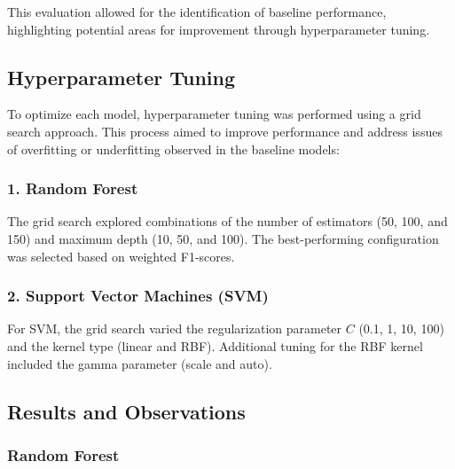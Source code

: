         This evaluation allowed for the identification of baseline performance, highlighting potential areas for improvement through hyperparameter tuning.

    \subsection{Hyperparameter Tuning}
    
        To optimize each model, hyperparameter tuning was performed using a grid search approach. This process aimed to improve performance and address issues of overfitting or underfitting observed in the baseline models:

        \subsubsection*{1. Random Forest \\}
        
            The grid search explored combinations of the number of estimators (50, 100, and 150) and maximum depth (10, 50, and 100). The best-performing configuration was selected based on weighted F1-scores.

        \subsubsection*{2. Support Vector Machines (SVM) \\}
        
            For SVM, the grid search varied the regularization parameter \( C \) (0.1, 1, 10, 100) and the kernel type (linear and RBF). Additional tuning for the RBF kernel included the gamma parameter (scale and auto).

    \subsection{Results and Observations}

        \subsubsection{Random Forest}
            
